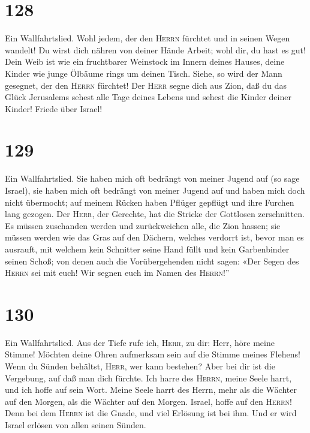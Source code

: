 \hypertarget{section-127}{%
\section{128}\label{section-127}}

 Ein Wallfahrtslied. Wohl jedem, der den \textsc{Herrn}
fürchtet und in seinen Wegen wandelt!  Du wirst dich
nähren von deiner Hände Arbeit; wohl dir, du hast es gut! 
Dein Weib ist wie ein fruchtbarer Weinstock im Innern deines Hauses,
deine Kinder wie junge Ölbäume rings um deinen Tisch. 
Siehe, so wird der Mann gesegnet, der den \textsc{Herrn} fürchtet!
 Der \textsc{Herr} segne dich aus Zion, daß du das Glück
Jerusalems sehest alle Tage deines Lebens  und sehest die
Kinder deiner Kinder! Friede über Israel!

\hypertarget{section-128}{%
\section{129}\label{section-128}}

 Ein Wallfahrtslied. Sie haben mich oft bedrängt von
meiner Jugend auf (so sage Israel),  sie haben mich oft
bedrängt von meiner Jugend auf und haben mich doch nicht übermocht;
 auf meinem Rücken haben Pflüger gepflügt und ihre Furchen
lang gezogen.  Der \textsc{Herr}, der Gerechte, hat die
Stricke der Gottlosen zerschnitten.  Es müssen zuschanden
werden und zurückweichen alle, die Zion hassen;  sie
müssen werden wie das Gras auf den Dächern, welches verdorrt ist, bevor
man es ausrauft,  mit welchem kein Schnitter seine Hand
füllt und kein Garbenbinder seinen Schoß;  von denen auch
die Vorübergehenden nicht sagen: «Der Segen des \textsc{Herrn} sei mit
euch! Wir segnen euch im Namen des \textsc{Herrn}!''

\hypertarget{section-129}{%
\section{130}\label{section-129}}

 Ein Wallfahrtslied. Aus der Tiefe rufe ich,
\textsc{Herr}, zu dir:  Herr, höre meine Stimme! Möchten
deine Ohren aufmerksam sein auf die Stimme meines Flehens!
 Wenn du Sünden behältst, \textsc{Herr}, wer kann
bestehen?  Aber bei dir ist die Vergebung, auf daß man
dich fürchte.  Ich harre des \textsc{Herrn}, meine Seele
harrt, und ich hoffe auf sein Wort.  Meine Seele harrt des
Herrn, mehr als die Wächter auf den Morgen, als die Wächter auf den
Morgen.  Israel, hoffe auf den \textsc{Herrn}! Denn bei
dem \textsc{Herrn} ist die Gnade, und viel Erlösung ist bei ihm.
 Und er wird Israel erlösen von allen seinen Sünden.

